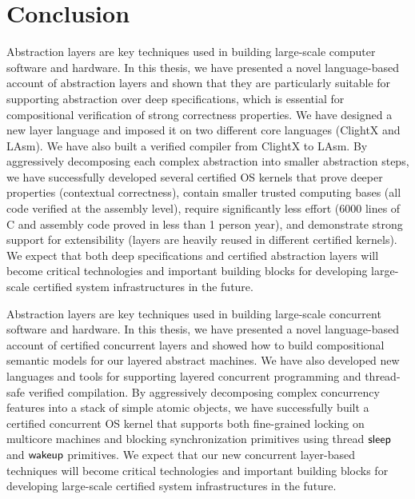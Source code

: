 \chapter{Conclusion}
\label{chap-concl}

Abstraction layers are key techniques used in building large-scale
computer software and hardware. In this thesis, we have presented a
novel language-based account of abstraction layers and shown that they
are particularly suitable for supporting abstraction over deep
specifications, which is essential for compositional verification of
strong correctness properties. We have designed a new layer language
and imposed it on two different core languages (ClightX and LAsm). We
have also built a verified compiler from ClightX to LAsm. By
aggressively decomposing each complex abstraction into smaller
abstraction steps, we have successfully developed several certified OS
kernels that prove deeper properties (contextual correctness), contain
smaller trusted computing bases (all code verified at the assembly
level), require significantly less effort (6000 lines of C and
assembly code proved in less than 1 person year), and demonstrate
strong support for extensibility (layers are heavily reused in
different certified kernels). We expect that both deep specifications
and certified abstraction layers will become critical technologies and
important building blocks for developing large-scale certified system
infrastructures in the future.

Abstraction layers are key techniques used in building large-scale
concurrent software and hardware. In this thesis, we have presented a
novel language-based account of certified concurrent layers and showed
how to build compositional semantic models for our layered abstract
machines. We have also developed new languages and tools for
supporting layered concurrent programming and thread-safe verified
compilation.  By aggressively decomposing complex concurrency features
into a stack of simple atomic objects, we have successfully built a
certified concurrent OS kernel that supports both fine-grained locking
on multicore machines and blocking synchronization primitives using
thread $\mathsf{sleep}$ and $\mathsf{wakeup}$ primitives. We expect that our new concurrent
layer-based techniques will become critical technologies and important
building blocks for developing large-scale certified system
infrastructures in the future.